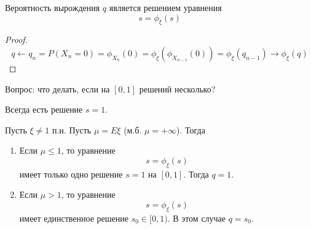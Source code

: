 \begin{lem}
Вероятность вырождения $q$ является решением уравнения
$$s = \phi_\xi(s)$$
\end{lem}
\begin{proof}
$$
q \leftarrow q_n = P(X_n = 0) = \phi_{X_n}(0) = \phi_\xi(\phi_{X_{n-1}}(0)) = \phi_\xi(q_{n-1})
\to \phi_\xi(q)
$$
\end{proof}

Вопрос: что делать, если на $[0,1]$ решений несколько?

Всегда есть решение $s = 1$.

\begin{theorem}

Пусть $\xi \neq 1$ п.н. Пусть $\mu = E\xi$ (м.б. $\mu = +\infty$). Тогда
\begin{enumerate}
\item Если $\mu \leq 1$, то уравнение
$$s = \phi_\xi(s)$$
имеет только одно решение $s = 1$ на $[0, 1]$. Тогда $q = 1$.
\item Если $\mu > 1$, то уравнение
$$s = \phi_\xi(s)$$
имеет единственное решение $s_0 \in [0, 1)$. В этом случае $q = s_0$.
\end{enumerate}
\end{theorem}
